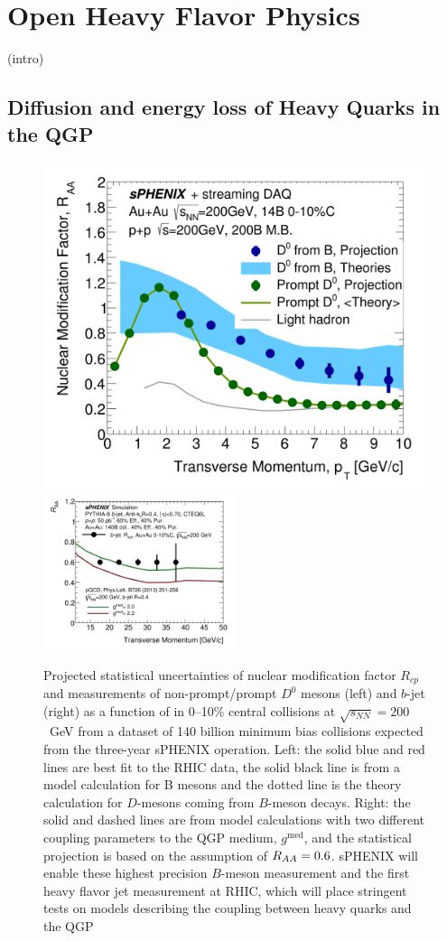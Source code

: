 \section{Open Heavy Flavor Physics}
\label{sec:HF}

(intro)

\subsection{Diffusion and energy loss of Heavy Quarks in the QGP}


\begin{figure}[htbp]
\centering
\includegraphics[width=.49\linewidth]{figs/RAA_DB_theory_root_RAADB_pp200B.pdf}
\includegraphics[width=0.5\textwidth]{figs/200pp_pythia8_CTEQ6L_7GeV_ALL_cfg_eneg_DSTReader_root_Draw_HFJetTruth_CrossSection2RAA_Theory_3yr_deta0_70.pdf}
\caption{Projected statistical uncertainties of nuclear modification factor $R_{cp}$ and \raa measurements of non-prompt/prompt $D^0$ mesons (left) and $b$-jet (right) as a function of \pT in 0--10\% central \auau collisions at $\sqrt{s_{NN}}=200$~GeV from a dataset of 140 billion minimum bias \auau collisions expected from the three-year sPHENIX operation. Left: the solid blue and red lines are best fit to the RHIC data, the solid black line is from a model calculation for B mesons and the dotted line is the theory calculation for $D$-mesons coming from $B$-meson decays. Right: the solid and dashed lines are from model calculations with two different coupling parameters to the QGP medium, $g^{\textrm{med}}$, and the statistical projection is based on the assumption of $\mbox{$R_{AA}$} =0.6$. sPHENIX will enable these highest precision $B$-meson measurement and the first heavy flavor jet measurement at RHIC, which will place stringent tests on models describing the coupling between heavy quarks and the QGP~\cite{Huang:2013vaa,Duke,TAMU,PHSD,CUJET}}
\label{fig:HF-inclusive-RAA}
\end{figure}

